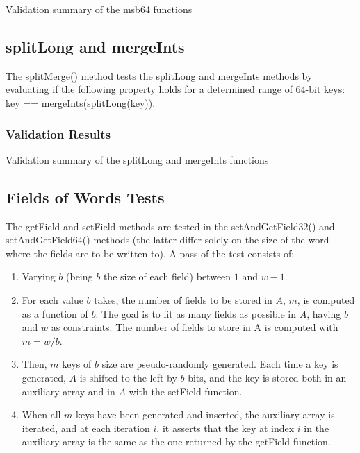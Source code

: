 \begin{table}[H]
\centering

\caption{Validation summary of the {\ttfamily msb64} functions}
\label{tab:msb64Validation}
\end{table}



\subsection{{\ttfamily splitLong} and {\ttfamily mergeInts}}

The {\ttfamily splitMerge()} method tests the {\ttfamily splitLong} and {\ttfamily mergeInts} methods by evaluating if the following property holds for a determined range of 64-bit keys: {\ttfamily key == mergeInts(splitLong(key))}.

\subsubsection{Validation Results}

\begin{table}[H]
\centering

\caption{Validation summary of the {\ttfamily splitLong} and {\ttfamily mergeInts} functions}
\label{tab:splitMergeValidation}
\end{table}

\subsection{Fields of Words Tests}
The {\ttfamily getField} and {\ttfamily setField} methods are tested in the {\ttfamily setAndGetField32()} and {\ttfamily setAndGetField64()} methods (the latter differ solely on the size of the word where the fields are to be written to). A pass of the test consists of:
\begin{enumerate}
    \item
    Varying $b$ (being $b$ the size of each field) between $1$ and $w - 1$.
    
    \item
    For each value $b$ takes, the number of fields to be stored in $A$, $m$, is computed as a function of $b$. The goal is to fit as many fields as possible in $A$, having $b$ and $w$ as constraints. The number of fields to store in A is computed with $m = w / b$.
    
    \item
    Then, $m$ keys of $b$ size are pseudo-randomly generated. Each time a key is generated, $A$ is shifted to the left by $b$ bits, and the key is stored both in an auxiliary array and in $A$ with the {\ttfamily setField} function. 
    
    \item
    When all $m$ keys have been generated and inserted, the auxiliary array is iterated, and at each iteration $i$, it asserts that the key at index $i$ in the auxiliary array is the same as the one returned by the {\ttfamily getField} function.
\end{enumerate}

